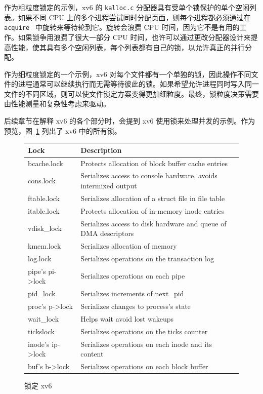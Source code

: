 作为粗粒度锁定的示例，xv6 的    \lstinline{kalloc.c}    分配器具有受单个锁保护的单个空闲列表。如果不同 CPU 上的多个进程尝试同时分配页面，则每个进程都必须通过在  {    \tt    acquire   }  中旋转来等待轮到它。旋转会浪费 CPU 时间，因为它不是有用的工作。如果锁争用浪费了很大一部分 CPU 时间，也许可以通过更改分配器设计来提高性能，使其具有多个空闲列表，每个列表都有自己的锁，以允许真正的并行分配。  

作为细粒度锁定的一个示例，xv6 对每个文件都有一个单独的锁，因此操作不同文件的进程通常可以继续执行而无需等待彼此的锁。如果希望允许进程同时写入同一文件的不同区域，则可以使文件锁定方案变得更加细粒度。最终，锁粒度决策需要由性能测量和复杂性考虑来驱动。  

后续章节在解释 xv6 的各个部分时，会提到 xv6 使用锁来处理并发的示例。作为预览，图~\ref{fig:locktable}    列出了 xv6 中的所有锁。  

   \begin{figure}[t]
\center
\begin{tabular}{ll}
{\bf Lock} & {\bf Description}  \\ 
\midrule bcache.lock & Protects allocation of block buffer cache entries  \\ cons.lock & Serializes access to console hardware, avoids intermixed output  \\ ftable.lock & Serializes allocation of a struct file in file table  \\ itable.lock & Protects allocation of in-memory inode entries  \\ vdisk\_lock & Serializes access to disk hardware and queue of DMA descriptors  \\ kmem.lock & Serializes allocation of memory  \\ log.lock & Serializes operations on the transaction log  \\ pipe's pi->lock & Serializes operations on each pipe  \\ pid\_lock & Serializes increments of next\_pid  \\ proc's p->lock & Serializes changes to process's state  \\ wait\_lock & Helps wait avoid lost wakeups  \\ tickslock & Serializes operations on the ticks counter  \\ inode's ip->lock & Serializes operations on each inode and its content  \\ buf's b->lock & Serializes operations on each block buffer  \\ 
\end{tabular}
\caption{锁定 xv6  }
\label{fig:locktable}
\end{figure}   
